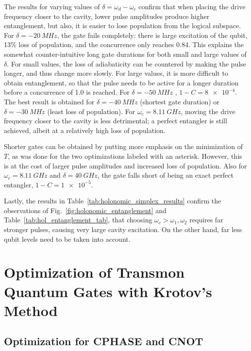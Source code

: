 The results for varying values of $\delta=\omega_d-\omega_c$ confirm that
when placing the drive frequency closer to the cavity, lower pulse amplitudes
produce higher entanglement, but also, it is easier to lose population from the
logical subspace. For $\delta = \SI{-20}{MHz}$, the gate fails completely:
there is large excitation of the qubit, 13\% loss of population, and the
concurrence only reaches 0.84. This explains the somewhat counter-intuitive
long gate durations for both small and large values of $\delta$. For small
values, the loss of adiabaticity can be countered by making the pulse longer,
and thus change more slowly. For large values, it is more difficult to obtain
entanglement, so that the pulse needs to be active for a longer duration before
a concurrence of 1.0 is reached. For $\delta = \SI{-50}{MHz}$ ,
$1-C = \num{8e-4}$. The best result is obtained for $\delta = \SI{-40}{MHz}$
(shortest gate duration) or $\delta = \SI{-30}{MHz}$ (least loss of population).
For $\omega_c = \SI{8.11}{GHz}$, moving the drive frequency closer to the cavity
is less detrimental; a perfect entangler is still achieved, albeit at
a relatively high loss of population.

Shorter gates can be obtained by putting more emphasis on the minimization of
$T$, as was done for the two optimizations labeled with an asterisk. However,
this is at the cost of larger pulse amplitudes and increased loss of population.
Also for $\omega_c=\SI{8.11}{GHz}$ and $\delta=\SI{40}{GHz}$, the gate falls
short of being an exact perfect entangler, $1-C = \num{1e-5}$.

Lastly, the results in Table~\ref{tab:holonomic_simplex_results} confirm the
observations of Fig.~\ref{fig:holonomic_entanglement} and
Table~\ref{tab:hol_entanglement_tab}, that choosing
$\omega_c > \omega_{1}, \omega_2$ requires far stronger pulses, causing very
large cavity excitation. On the other hand, far less qubit levels need to be
taken into account.


\section[Optimization of Transmon Quantum Gates]{Optimization of Transmon Quantum Gates with Krotov's Method}

\subsection{Optimization for CPHASE and CNOT}
\label{subsec:tm_oct_direct}

